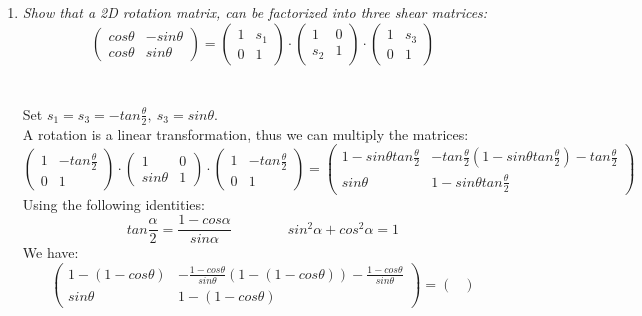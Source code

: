 \documentclass{article}
\begin{document}
\begin{enumerate}
    \item \textsl{
        Show that a 2D rotation matrix, can be factorized into three shear matrices:
        $$
            \begin{pmatrix}
                cos\theta&-sin\theta\\cos\theta&sin\theta
            \end{pmatrix} =
            \begin{pmatrix}1&s_1\\0&1\end{pmatrix}\cdot
            \begin{pmatrix}1&0\\s_2&1\end{pmatrix}\cdot
            \begin{pmatrix}1&s_3\\0&1\end{pmatrix}
        $$
    }
    \\\\
    \noindent
    Set $s_1 = s_3 = -tan\frac{\theta}{2},\ s_3 = sin\theta$.\\
    A rotation is a linear transformation, thus we can multiply the matrices:
    $$
        \begin{pmatrix}1&-tan\frac{\theta}{2}\\0&1\end{pmatrix}\cdot
        \begin{pmatrix}1&0\\sin\theta&1\end{pmatrix}\cdot
        \begin{pmatrix}1&-tan\frac{\theta}{2}\\0&1\end{pmatrix} =
        \begin{pmatrix}
            1-sin\theta tan\frac{\theta}{2}& -tan\frac{\theta}{2}(1-sin\theta tan\frac{\theta}{2}) -tan\frac{\theta}{2}\\
            sin\theta& 1-sin\theta tan\frac{\theta}{2}
        \end{pmatrix}
    $$
    Using the following identities:
    $$tan\frac{\alpha}{2} = \dfrac{1-cos\alpha}{sin\alpha}\qquad\qquad sin^2\alpha + cos^2\alpha = 1$$
    We have:
    $$
        \begin{pmatrix}
            1-(1-cos\theta)&-\frac{1-cos\theta}{sin\theta}(1-(1-cos\theta)) -\frac{1-cos\theta}{sin\theta}\\
            sin\theta& 1-(1-cos\theta)
        \end{pmatrix} =
        \begin{pmatrix}

\end{pmatrix}$$
\end{enumerate}
\end{document}

